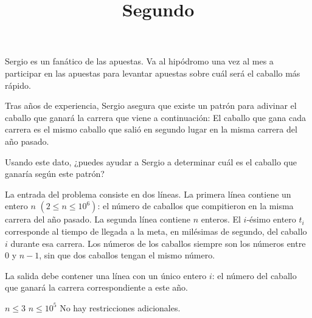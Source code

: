 \documentclass{oci}
\title{Segundo}
\begin{document}
\begin{problemDescription}
Sergio es un fanático de las apuestas.
Va al hipódromo una vez al mes a participar en las apuestas para levantar apuestas sobre cuál será el caballo más rápido.

Tras años de experiencia, Sergio asegura que existe un patrón para adivinar el caballo que ganará la carrera que viene a continuación:
El caballo que gana cada carrera es el mismo caballo que salió en segundo lugar en la misma carrera del año pasado.

Usando este dato, ¿puedes ayudar a Sergio a determinar cuál es el caballo que ganaría según este patrón?
\end{problemDescription}

\begin{inputDescription}
La entrada del problema consiste en dos líneas.
La primera línea contiene un entero $n$ $(2 \le n \le 10^6)$: el número de caballos que compitieron en la misma carrera del año pasado.
La segunda línea contiene $n$ enteros. El $i$-ésimo entero $t_i$ corresponde al tiempo de llegada a la meta, en milésimas de segundo, del caballo $i$ durante esa carrera. Los números de los caballos siempre son los números entre $0$ y $n-1$, sin que dos caballos tengan el mismo número.
\end{inputDescription}

\begin{outputDescription}
La salida debe contener una línea con un único entero $i$: el número del caballo que ganará la carrera correspondiente a este año.
\end{outputDescription}

\begin{scoreDescription}
  $n \le 3$ 
  $n \le 10^5$
  No hay restricciones adicionales.
\end{scoreDescription}

\begin{sampleDescription}
\end{sampleDescription}
\end{document}

